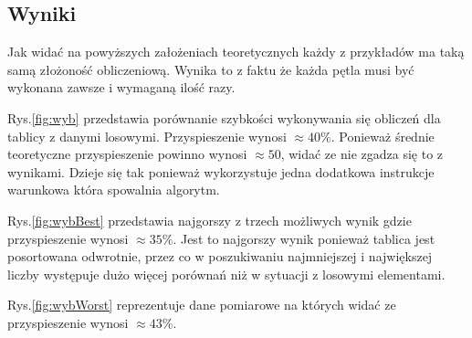 \subsection{Wyniki}
Jak widać na powyższych założeniach teoretycznych każdy z przykładów ma taką samą złożoność obliczeniową. Wynika to z faktu że każda pętla musi być wykonana zawsze i wymaganą ilość razy.	
\par Rys.\ref{fig:wyb} przedstawia porównanie szybkości wykonywania się obliczeń dla tablicy z danymi losowymi. Przyspieszenie wynosi $\approx 40\%$. Ponieważ średnie teoretyczne przyspieszenie powinno wynosi $\approx 50$, widać ze nie zgadza się to z wynikami. Dzieje się tak ponieważ wykorzystuje jedna dodatkowa instrukcje warunkowa która spowalnia algorytm.
\par Rys.\ref{fig:wybBest} przedstawia najgorszy z trzech możliwych wynik gdzie przyspieszenie wynosi $\approx 35\%$. Jest to najgorszy wynik ponieważ tablica jest posortowana odwrotnie, przez co w poszukiwaniu najmniejszej i największej liczby występuje dużo więcej porównań niż w sytuacji z losowymi elementami.
\par Rys.\ref{fig:wybWorst} reprezentuje dane pomiarowe na których widać ze przyspieszenie wynosi $\approx 43\%$. \\

